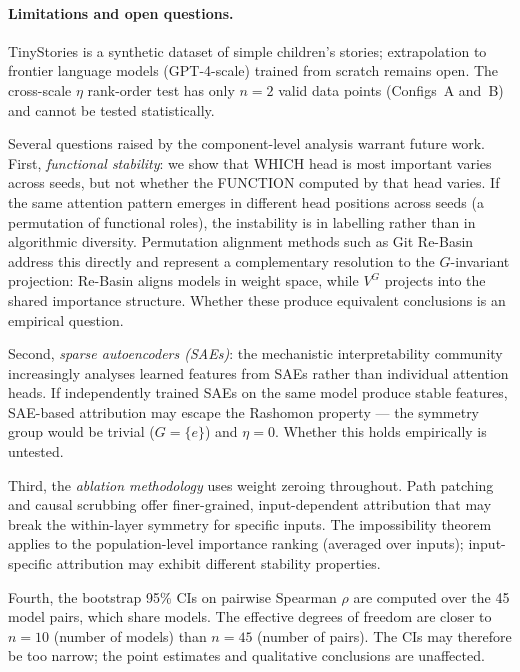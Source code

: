 \documentclass[11pt,a4paper]{article}
\begin{document}
\paragraph{Limitations and open questions.}
TinyStories is a synthetic dataset of simple children's stories; extrapolation to frontier language models (GPT-4-scale) trained from scratch remains open.  The cross-scale $\eta$ rank-order test has only $n = 2$ valid data points (Configs~A and~B) and cannot be tested statistically.

Several questions raised by the component-level analysis warrant future work.  First, \emph{functional stability}: we show that WHICH head is most important varies across seeds, but not whether the FUNCTION computed by that head varies.  If the same attention pattern emerges in different head positions across seeds (a permutation of functional roles), the instability is in labelling rather than in algorithmic diversity.  Permutation alignment methods such as Git Re-Basin~\cite{ainsworth2023git} address this directly and represent a complementary resolution to the $G$-invariant projection: Re-Basin aligns models in weight space, while $V^G$ projects into the shared importance structure.  Whether these produce equivalent conclusions is an empirical question.

Second, \emph{sparse autoencoders (SAEs)}: the mechanistic interpretability community increasingly analyses learned features from SAEs rather than individual attention heads.  If independently trained SAEs on the same model produce stable features, SAE-based attribution may escape the Rashomon property --- the symmetry group would be trivial ($G = \{e\}$) and $\eta = 0$.  Whether this holds empirically is untested.

Third, the \emph{ablation methodology} uses weight zeroing throughout.  Path patching~\cite{goldowskydill2023localizing} and causal scrubbing offer finer-grained, input-dependent attribution that may break the within-layer symmetry for specific inputs.  The impossibility theorem applies to the population-level importance ranking (averaged over inputs); input-specific attribution may exhibit different stability properties.

Fourth, the bootstrap 95\% CIs on pairwise Spearman $\rho$ are computed over the 45 model pairs, which share models.  The effective degrees of freedom are closer to $n = 10$ (number of models) than $n = 45$ (number of pairs).  The CIs may therefore be too narrow; the point estimates and qualitative conclusions are unaffected.
\end{document}
